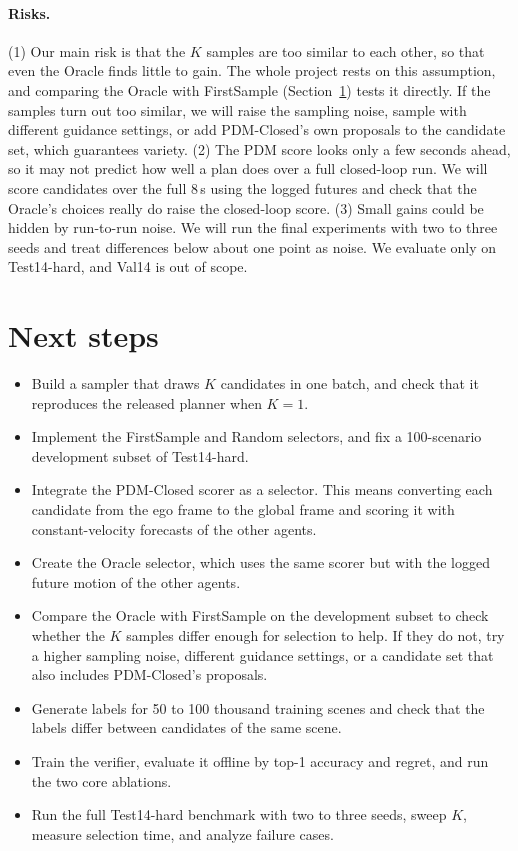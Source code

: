 \documentclass{article}
\begin{document}
\paragraph{Risks.}
(1) Our main risk is that the $K$ samples are too similar to each other, so that even the Oracle finds little to gain. The whole project rests on this assumption, and comparing the Oracle with FirstSample (Section~\ref{sec:next}) tests it directly. If the samples turn out too similar, we will raise the sampling noise, sample with different guidance settings, or add PDM-Closed's own proposals to the candidate set, which guarantees variety.
(2) The PDM score looks only a few seconds ahead, so it may not predict how well a plan does over a full closed-loop run. We will score candidates over the full 8\,s using the logged futures and check that the Oracle's choices really do raise the closed-loop score.
(3) Small gains could be hidden by run-to-run noise. We will run the final experiments with two to three seeds and treat differences below about one point as noise.
We evaluate only on Test14-hard, and Val14 is out of scope.

\section{Next steps}
\label{sec:next}
\begin{itemize}
\item Build a sampler that draws $K$ candidates in one batch, and check that it reproduces the released planner when $K=1$.
\item Implement the FirstSample and Random selectors, and fix a 100-scenario development subset of Test14-hard.
\item Integrate the PDM-Closed scorer as a selector. This means converting each candidate from the ego frame to the global frame and scoring it with constant-velocity forecasts of the other agents.
\item Create the Oracle selector, which uses the same scorer but with the logged future motion of the other agents.
\item Compare the Oracle with FirstSample on the development subset to check whether the $K$ samples differ enough for selection to help. If they do not, try a higher sampling noise, different guidance settings, or a candidate set that also includes PDM-Closed's proposals.
\item Generate labels for 50 to 100 thousand training scenes and check that the labels differ between candidates of the same scene.
\item Train the verifier, evaluate it offline by top-1 accuracy and regret, and run the two core ablations.
\item Run the full Test14-hard benchmark with two to three seeds, sweep $K$, measure selection time, and analyze failure cases.
\end{itemize}
\end{document}
